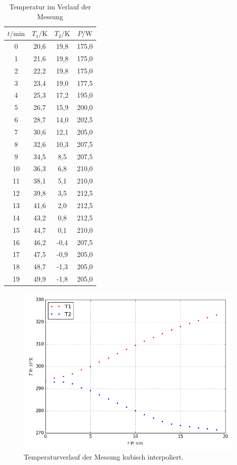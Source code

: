 \begin{table}[H]
\centering
\caption{Temperatur im Verlauf der Messung}
\label{tab:Dicke}
  \begin{tabular}{c c c c}
    \toprule
    $t/ \si{\minute}$ & $T_1/\si{\kelvin}$ & $T_2/\si{\kelvin}$ & $P/\si{\watt}$\\
    \midrule 
    0   &  20,6 & 19,8 & 175,0\\
    1   &  21,6 & 19,8 & 175,0\\
    2   &  22,2 & 19,8 & 175,0\\
    3   &  23,4 & 19,0 & 177,5\\
    4   &  25,3 & 17,2 & 195,0\\
    5   &  26,7 & 15,9 & 200,0\\
    6   &  28,7 & 14,0 & 202,5\\
    7   &  30,6 & 12,1 & 205,0\\
    8   &  32,6 & 10,3 & 207,5\\
    9   &  34,5 & 8,5  & 207,5\\
    10  &  36,3 & 6,8  & 210,0\\
    11  &  38,1 & 5,1  & 210,0\\
    12  &  39,8 & 3,5  & 212,5\\
    13  &  41,6 & 2,0  & 212,5\\
    14  &  43,2 & 0,8  & 212,5\\
    15  &  44,7 & 0,1  & 210,0\\
    16  &  46,2 & -0,4 & 207,5\\
    17  &  47,5 & -0,9 & 205,0\\
    18  &  48,7 & -1,3 & 205,0\\
    19  &  49,9 & -1,8 & 205,0\\
    \bottomrule
  \end{tabular}
\end{table}

\begin{figure}[H]
  \centering
  \includegraphics[width=\textwidth]{Temperatur.png}
  \caption{Temperaturverlauf der Messung kubisch interpoliert.}
  \label{fig:1}
\end{figure}

